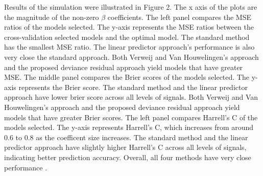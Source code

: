 \par Results of the simulation were illustrated in Figure 2. The x axis of the plots are the magnitude of the non-zero $\beta$ coefficients. The left panel compares the MSE ratios of the models selected.  The y-axis represents the MSE ratios between the cross-validation selected models and the optimal model. The standard method has the smallest MSE ratio. The linear predictor approach's performance is also very close the standard approach. Both Verweij and Van Houwelingen's approach and the proposed deviance residual approach yield models that have greater MSE. The middle panel compares the Brier scores of the models selected. The y-axis represents the Brier score. The standard method and the linear predictor approach have lower brier score across all levels of signals. Both Verweij and Van Houwelingen's approach and the proposed deviance residual approach yield models that have greater Brier scores. The left panel compares Harrell's C of the models selected. The y-axis represents Harrell's C, which increases from around 0.6 to 0.8 as the coefficent size increases. The standard method and the linear predictor approach have slightly higher Harrell's C across all levels of signals, indicating better prediction accuracy. Overall, all four methods have very close performance . 
 

